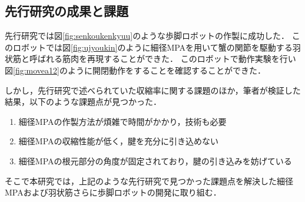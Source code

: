 \subsection{先行研究の成果と課題}
先行研究\cite{hasegawa}では図\ref{fig:senkoukenkyuu}のような歩脚ロボットの作製に成功した．
このロボットでは図\ref{fig:ujyoukin}のように細径MPAを用いて蟹の関節を駆動する羽状筋と呼ばれる筋肉を再現することができた\cite{hasegawa}．
このロボットで動作実験を行い図\ref{fig:movea12}のように開閉動作をすることを確認することができた．

しかし，先行研究で述べられていた収縮率に関する課題\cite{hasegawa}のほか，筆者が検証した結果，以下のような課題点が見つかった．
\begin{enumerate}
  \item 細径MPAの作製方法が煩雑で時間がかかり，技術も必要
  \item 細径MPAの収縮性能が低く，腱を充分に引き込めない
  \item 細径MPAの根元部分の角度が固定されており，腱の引き込みを妨げている
\end{enumerate}
そこで本研究では，上記のような先行研究で見つかった課題点を解決した細径MPAおよび羽状筋さらに歩脚ロボットの開発に取り組む．
